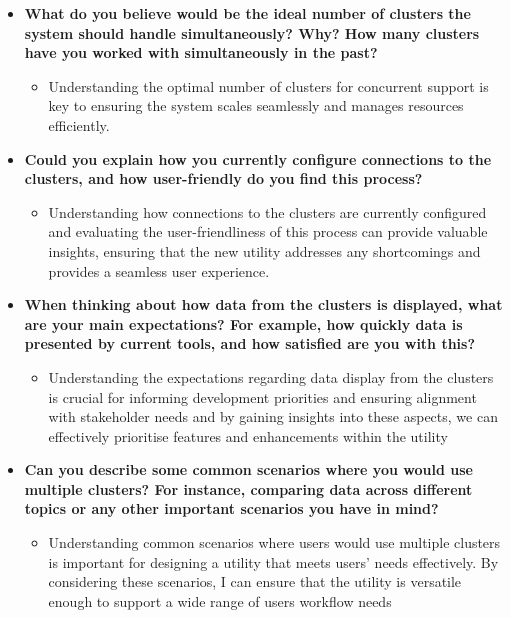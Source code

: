 \documentclass[10pt , a4paper]{report}
\begin{document}
\begin{itemize}
    \item \textbf{What do you believe would be the ideal number of clusters the system should handle simultaneously? Why? How many clusters have you worked with simultaneously in the past?}
        \begin{itemize}
            \item Understanding the optimal number of clusters for concurrent support is key to ensuring the system scales seamlessly and manages resources efficiently.
        \end{itemize}
    \item \textbf{Could you explain how you currently configure connections to the clusters, and how user-friendly do you find this process?}
        \begin{itemize}
            \item Understanding how connections to the clusters are currently configured and evaluating the user-friendliness of this process can provide valuable insights, ensuring that the new utility addresses any shortcomings and provides a seamless user experience.
        \end{itemize}
    \item \textbf{When thinking about how data from the clusters is displayed, what are your main expectations? For example, how quickly data is presented by current tools, and how satisfied are you with this?}
        \begin{itemize}
            \item Understanding the expectations regarding data display from the clusters is crucial for informing development priorities and ensuring alignment with stakeholder needs and by gaining insights into these aspects, we can effectively prioritise features and enhancements within the utility
        \end{itemize}
    \item \textbf{Can you describe some common scenarios where you would use multiple clusters? For instance, comparing data across different topics or any other important scenarios you have in mind?}
        \begin{itemize}
            \item Understanding common scenarios where users would use multiple clusters is important for designing a utility that meets users’ needs effectively. By considering these scenarios, I can ensure that the utility is versatile enough to support a wide range of users workflow needs
        \end{itemize}
\end{itemize}
\end{document}
